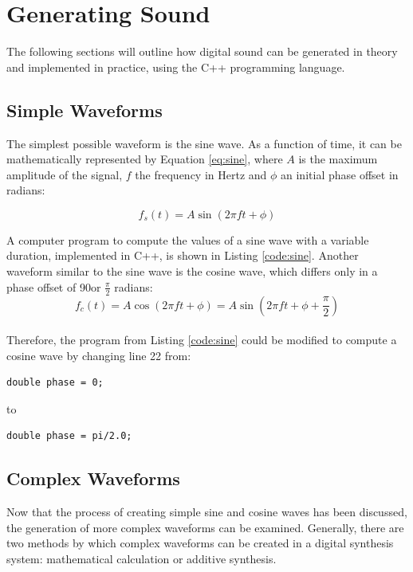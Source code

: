 \chapter{Generating Sound}

The following sections will outline how digital sound can be generated in theory and implemented in practice, using the C++ programming language.

\section{Simple Waveforms}

The simplest possible waveform is the sine wave. As a function of time, it can be mathematically represented by Equation \ref{eq:sine}, where $A$ is the maximum amplitude of the signal, $f$ the frequency in Hertz and $\phi$ an initial phase offset in radians:

\begin{equation}
  f_{s}(t) = A \sin(2 \pi  f t + \phi)
  \label{eq:sine}
\end{equation}

A computer program to compute the values of a sine wave with a variable duration, implemented in C++, is shown in Listing \ref{code:sine}. Another waveform similar to the sine wave is the cosine wave, which differs only in a phase offset of 90\degree or $\frac{\pi}{2}$ radians:\\
\begin{equation}
  f_{c}(t) = A \cos(2 \pi  f t + \phi) = A \sin(2 \pi f t + \phi + \frac{\pi}{2})
  \label{eq:cosine}
  \end{equation}\\
  Therefore, the program from Listing \ref{code:sine} could be modified to compute a cosine wave by changing line 22 from:\\

  \begin{lstlisting}[firstnumber=22]
    double phase = 0;
  \end{lstlisting}
  to
  \begin{lstlisting}[firstnumber=22]
    double phase = pi/2.0;
  \end{lstlisting}

  \section{Complex Waveforms}

  Now that the process of creating simple sine and cosine waves has been discussed, the generation of more complex waveforms can be examined. Generally, there are two methods by which complex waveforms can be created in a digital synthesis system: mathematical calculation or additive synthesis.

